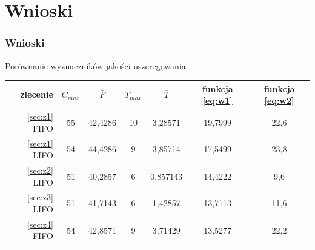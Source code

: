 \documentclass{prezentacja}
\begin{document}
\section{Wnioski}
\begin{frame}
    \frametitle{Wnioski}
    Porównanie wyznaczników jakości uszeregowania
    \begin{table}[htb]
	    \centering
	    \scriptsize
	    \begin{tabular}{ r | c | c | c | c | c | c }
	    zlecenie       & \(C_{max}\)	& \(\bar{F}\)   & \(T_{max}\) & \(\bar{T}\) & funkcja \eqref{eq:w1} & funkcja \eqref{eq:w2} \\ \hline
	    \ref{sec:z1} FIFO & \cellcolor{lightRed} 55 & 42,4286 & \cellcolor{lightRed} 10 & 3,28571 & \cellcolor{lightRed} 19,7999 & 22,6 \\ \hline
	    \ref{sec:z1} LIFO & 54 & \cellcolor{lightRed}44,4286 & 9 & \cellcolor{lightRed} 3,85714 & 17,5499 & \cellcolor{lightRed} 23,8 \\ \hline
        \ref{sec:z2} LIFO & \cellcolor{lightGreen} 51 & \cellcolor{lightGreen} 40,2857 & \cellcolor{lightGreen} 6  & \cellcolor{lightGreen} 0,857143 & 14,4222 & \cellcolor{lightGreen} 9,6  \\ \hline
	    \ref{sec:z3} LIFO & \cellcolor{lightGreen} 51 & 41,7143       & 6           & 1,42857      & 13,7113      & 11,6 \\ \hline
	    \ref{sec:z4} FIFO & 54          & 42,8571       & 9           & 3,71429      & \cellcolor{lightGreen} 13,5277 & 22,2 \\ 
	    \end{tabular}
    \end{table}
\end{frame}
\end{document}
